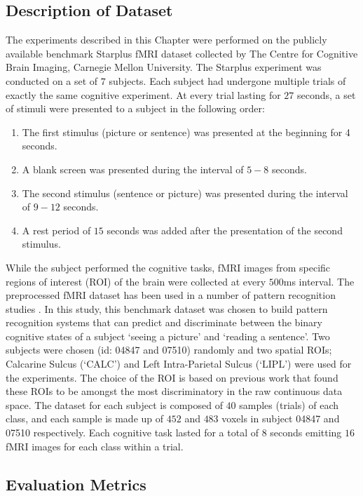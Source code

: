 \subsection{Description of Dataset}
The experiments described in this Chapter were performed on the publicly available benchmark Starplus fMRI dataset \citep{mitchell2001starplus} collected by The Centre for Cognitive Brain Imaging, Carnegie Mellon University. The Starplus experiment was conducted on a set of $7$ subjects. Each subject had undergone multiple trials of exactly the same cognitive experiment. At every trial lasting for $27$ seconds, a set of stimuli were presented to a subject in the following order:
\begin{enumerate}
	\item The first stimulus (picture or sentence) was presented at the beginning for 4 seconds.
	\item A blank screen was presented during the interval of $5-8$ seconds.
	\item The second stimulus (sentence or picture) was presented during the interval of $9-12$ seconds.
	\item A rest period of $15$ seconds was added after the presentation of the second stimulus.
\end{enumerate}
While the subject performed the cognitive tasks, fMRI images from specific regions of interest (ROI) of the brain were collected at every $500$ms interval. The preprocessed fMRI dataset has been used in a number of pattern recognition studies \citep{mitchell2003classifying, mitchell2008predicting, shinkareva2008using}. In this study, this benchmark dataset was chosen to build pattern recognition systems that can predict and discriminate between the binary cognitive states of a subject `seeing a picture' and `reading a sentence'. Two subjects were chosen (id: 04847 and 07510) randomly and two spatial ROIs; Calcarine Sulcus (`CALC') and Left Intra-Parietal Sulcus (`LIPL') were used for the experiments. The choice of the ROI is based on previous work \citep{do2014robust} that found these ROIs to be amongst the most discriminatory in the raw continuous data space. The dataset for each subject is composed of $40$ samples (trials) of each class, and each sample is made up of $452$ and $483$ voxels in subject 04847 and 07510 respectively. Each cognitive task lasted for a total of $8$ seconds emitting $16$ fMRI images for each class within a trial.

\subsection{Evaluation Metrics}

